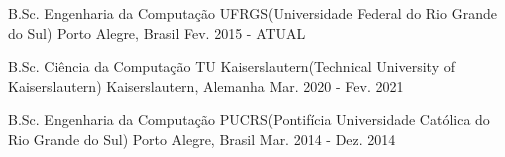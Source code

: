
\begin{cventries}
    \cvcompactentry
    {B.Sc. Engenharia da Computação} %
    {UFRGS(Universidade Federal do Rio Grande do Sul)} %
    {Porto Alegre, Brasil} %
    {Fev. 2015 - ATUAL} %

    \cvcompactentry
    {B.Sc. Ciência da Computação} %
    {TU Kaiserslautern(Technical University of Kaiserslautern)} %
    {Kaiserslautern, Alemanha} %
    {Mar. 2020 - Fev. 2021} %

    \cvcompactentry
    {B.Sc. Engenharia da Computação} %
    {PUCRS(Pontifícia Universidade Católica do Rio Grande do Sul)} %
    {Porto Alegre, Brasil} %
    {Mar. 2014 - Dez. 2014} %
\end{cventries}
